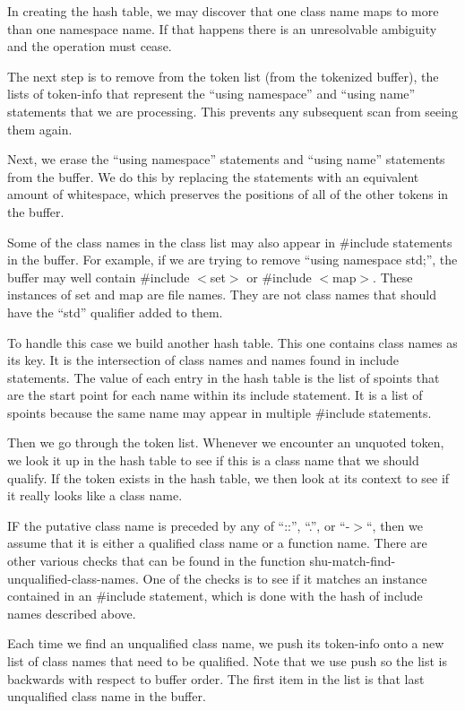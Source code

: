 \begin{doc-string}
In creating the hash table, we may discover that one class name maps to more
than one namespace name.  If that happens there is an unresolvable ambiguity and
the operation must cease.

The next step is to remove from the token list (from the tokenized buffer), the
lists of token-info that represent the ``using namespace'' and ``using name''
statements that we are processing.  This prevents any subsequent scan from
seeing them again.

Next, we erase the ``using namespace'' statements and ``using name'' statements
from the buffer.  We do this by replacing the statements with an equivalent
amount of whitespace, which preserves the positions of all of the other tokens
in the buffer.

Some of the class names in the class list may also appear in \#include statements
in the buffer.  For example, if we are trying to remove ``using namespace
std;'', the buffer may well contain \#include $<$set$>$ or \#include $<$map$>$.  These
instances of set and map are file names.  They are not class names that should
have the ``std'' qualifier added to them.

To handle this case we build another hash table.  This one contains class names
as its key.  It is the intersection of class names and names found in include
statements.  The value of each entry in the hash table is the list of spoints
that are the start point for each name within its include statement.  It is a
list of spoints because the same name may appear in multiple \#include
statements.

Then we go through the token list.  Whenever we encounter an unquoted token, we
look it up in the hash table to see if this is a class name that we should
qualify.  If the token exists in the hash table, we then look at its context to
see if it really looks like a class name.

IF the putative class name is preceded by any of ``::'', ``.'', or ``-$>$``, then
we assume that it is either a qualified class name or a function name.  There
are other various checks that can be found in the function
shu-match-find-unqualified-class-names.  One of the checks is to see if it
matches an instance contained in an \#include statement, which is done with the
hash of include names described above.

Each time we find an unqualified class name, we push its token-info onto a new
list of class names that need to be qualified.  Note that we use push so the
list is backwards with respect to buffer order.  The first item in the list is
that last unqualified class name in the buffer.


\end{doc-string}
